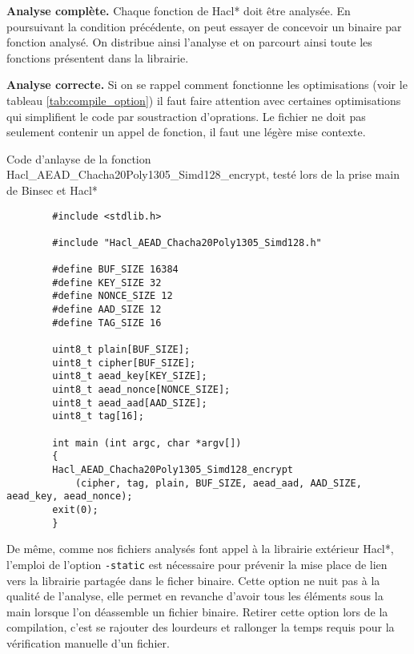 \textbf{Analyse complète.} Chaque fonction de Hacl* doit être analysée. En poursuivant la condition précédente, on peut essayer de concevoir un binaire par fonction analysé. On distribue ainsi l'analyse et on parcourt ainsi toute les fonctions présentent dans la librairie.\medbreak

\textbf{Analyse correcte.} Si on se rappel comment fonctionne les optimisations (voir le tableau \ref{tab:compile_option}) il faut faire attention avec certaines optimisations qui simplifient le code par soustraction d'oprations. Le fichier ne doit pas seulement contenir un appel de fonction, il faut une légère mise contexte.

\begin{listing}[!ht]
    \caption{Code d'anlayse de la fonction Hacl\_AEAD\_Chacha20Poly1305\_Simd128\_encrypt, testé lors de la prise main de Binsec et Hacl*}
    \label{lst:prise_en_main}
    \begin{verbatim}
        #include <stdlib.h>

        #include "Hacl_AEAD_Chacha20Poly1305_Simd128.h"

        #define BUF_SIZE 16384
        #define KEY_SIZE 32
        #define NONCE_SIZE 12
        #define AAD_SIZE 12
        #define TAG_SIZE 16

        uint8_t plain[BUF_SIZE];
        uint8_t cipher[BUF_SIZE];
        uint8_t aead_key[KEY_SIZE];
        uint8_t aead_nonce[NONCE_SIZE];
        uint8_t aead_aad[AAD_SIZE];
        uint8_t tag[16];

        int main (int argc, char *argv[])
        {
        Hacl_AEAD_Chacha20Poly1305_Simd128_encrypt
            (cipher, tag, plain, BUF_SIZE, aead_aad, AAD_SIZE, aead_key, aead_nonce);
        exit(0);
        }
    \end{verbatim}
\end{listing}

De même, comme nos fichiers analysés font appel à la librairie extérieur Hacl*, l'emploi de l'option \texttt{-static} est nécessaire pour prévenir la mise place de lien vers la librairie partagée dans le ficher binaire. Cette option ne nuit pas à la qualité de l'analyse, elle permet en revanche d'avoir tous les éléments sous la main lorsque l'on déassemble un fichier binaire. Retirer cette option lors de la compilation, c'est se rajouter des lourdeurs et rallonger la temps requis pour la vérification manuelle d'un fichier.\medbreak

